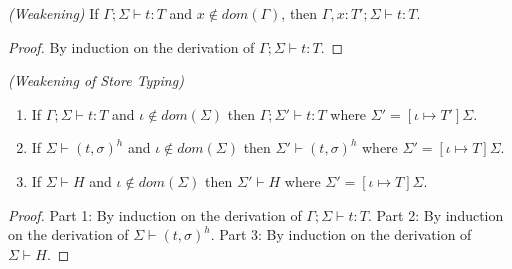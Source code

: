 \begin{lem}
\emph{(Weakening)}\label{lem:weakening}
If $\Gamma ; \Sigma \vdash t : T$ and $x \notin dom(\Gamma)$, then
$\Gamma , x : T' ; \Sigma \vdash t : T$.
\end{lem}
\begin{proof}
By induction on the derivation of $\Gamma ; \Sigma \vdash t : T$.
\end{proof}

\begin{lem}
\emph{(Weakening of Store Typing)}\label{lem:weakening-store-typing}
\begin{enumerate}
\item If $\Gamma ; \Sigma \vdash t : T$ and $\iota \notin \mathit{dom}(\Sigma)$ then $\Gamma ; \Sigma' \vdash t : T$ where $\Sigma' = [\iota \mapsto T']\Sigma$.
\item If $\Sigma \vdash (t, \sigma)^h$ and $\iota \notin \mathit{dom}(\Sigma)$ then $\Sigma' \vdash (t, \sigma)^h$ where $\Sigma' = [\iota \mapsto T]\Sigma$.
\item If $\Sigma \vdash H$ and $\iota \notin \mathit{dom}(\Sigma)$ then $\Sigma' \vdash H$ where $\Sigma' = [\iota \mapsto T]\Sigma$.
\end{enumerate}
\end{lem}
\begin{proof}
Part 1: By induction on the derivation of $\Gamma ; \Sigma \vdash t : T$. Part 2: By induction on the derivation of $\Sigma \vdash (t, \sigma)^h$. Part 3: By induction on the derivation of $\Sigma \vdash H$.
\end{proof}

